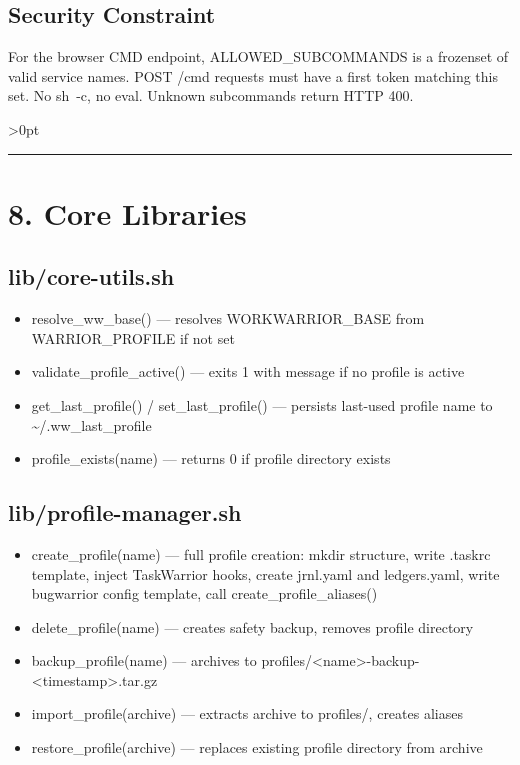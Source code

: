 \documentclass[11pt, a4paper, DIV=14]{scrartcl}
\renewcommand{\texttt}[1]{{\ttfamily\fontsize{8.5}{10.5}\selectfont\color{BabbNavy}#1}}
\providecommand{\tightlist}{\setlength{\itemsep}{2pt}\setlength{\parskip}{0pt}}
\let\origRule\rule
\renewcommand{\rule}[3][0pt]{%
  \ifnum\dimexpr#3\relax>0pt
    \par\vspace{2pt}\noindent{\color{BabbBorder}\origRule[#1]{#2}{#3}}\par\vspace{2pt}%
  \else
    \origRule[#1]{#2}{#3}%
  \fi
}
\begin{document}
\subsection{Security Constraint}\label{security-constraint}

For the browser CMD endpoint, \texttt{ALLOWED\_SUBCOMMANDS} is a
frozenset of valid service names. POST /cmd requests must have a first
token matching this set. No \texttt{sh\ -c}, no eval. Unknown
subcommands return HTTP 400.

\begin{center}\rule{0.5\linewidth}{0.5pt}\end{center}

\section{8. Core Libraries}\label{core-libraries}

\subsection{lib/core-utils.sh}\label{libcore-utils.sh}

\begin{itemize}
\tightlist
\item
  \texttt{resolve\_ww\_base()} --- resolves \texttt{WORKWARRIOR\_BASE}
  from \texttt{WARRIOR\_PROFILE} if not set
\item
  \texttt{validate\_profile\_active()} --- exits 1 with message if no
  profile is active
\item
  \texttt{get\_last\_profile()} / \texttt{set\_last\_profile()} ---
  persists last-used profile name to
  \texttt{\textasciitilde{}/.ww\_last\_profile}
\item
  \texttt{profile\_exists(name)} --- returns 0 if profile directory
  exists
\end{itemize}

\subsection{lib/profile-manager.sh}\label{libprofile-manager.sh}

\begin{itemize}
\tightlist
\item
  \texttt{create\_profile(name)} --- full profile creation: mkdir
  structure, write \texttt{.taskrc} template, inject TaskWarrior hooks,
  create \texttt{jrnl.yaml} and \texttt{ledgers.yaml}, write bugwarrior
  config template, call \texttt{create\_profile\_aliases()}
\item
  \texttt{delete\_profile(name)} --- creates safety backup, removes
  profile directory
\item
  \texttt{backup\_profile(name)} --- archives to
  \texttt{profiles/\textless{}name\textgreater{}-backup-\textless{}timestamp\textgreater{}.tar.gz}
\item
  \texttt{import\_profile(archive)} --- extracts archive to
  \texttt{profiles/}, creates aliases
\item
  \texttt{restore\_profile(archive)} --- replaces existing profile
  directory from archive
\end{itemize}
\end{document}

